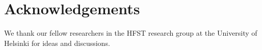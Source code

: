 \documentclass[postprint]{flammie}
\begin{document}
\section*{Acknowledgements}

We thank our fellow researchers in the HFST research group at the University of
Helsinki for ideas and discussions.



\end{document}
